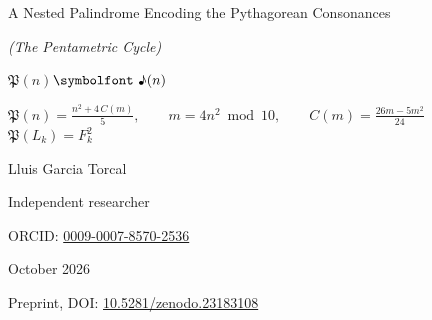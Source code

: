 \documentclass[11pt,a4paper]{article}
\newcommand{\gr}[1]{{\greekfont #1}}                 %
\newcommand{\Pent}{\mathfrak{P}}                      %
\newcommand{\note}{\text{\symbolfont ♪}}              %
\theoremstyle{plain}
\theoremstyle{definition}
\theoremstyle{remark}
\begin{document}
\begin{titlepage}
\centering
\vspace*{2.2cm}
{\fontsize{30}{36}\selectfont \gr{Ὁ Πενταμετρικὸς Κύκλος}\par}
\vspace{0.6cm}
{\Large A Nested Palindrome Encoding the Pythagorean Consonances\par}
\vspace{0.3cm}
{\large\itshape (The Pentametric Cycle)\par}
\vspace{1.6cm}
{\fontsize{40}{48}\selectfont $\Pent(n)$\qquad $\note(n)$\par}
\vspace{1.4cm}
\begin{minipage}{0.78\textwidth}\centering\small
$\displaystyle \Pent(n)=\frac{n^{2}+4\,C(m)}{5},\qquad m=4n^{2}\bmod 10,\qquad C(m)=\frac{26m-5m^{2}}{24}$
\\[0.8em]
$\displaystyle \Pent(L_k)=F_k^{2}$
\end{minipage}
\vfill
{\large Lluis Garcia Torcal\par}
\vspace{0.2cm}
{Independent researcher\par}
\vspace{0.1cm}
{\small ORCID: \href{https://orcid.org/0009-0007-8570-2536}{0009-0007-8570-2536}\par}
\vspace{0.2cm}
{October 2026\par}
\vspace{1.2cm}
{\small Preprint, DOI: \href{https://doi.org/10.5281/zenodo.23183108}{10.5281/zenodo.23183108}\par}
\end{titlepage}
\end{document}
